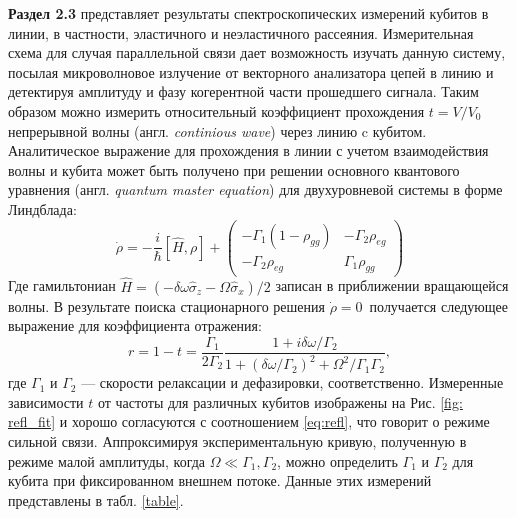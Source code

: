 \textbf{Раздел 2.3} представляет результаты спектроскопических измерений кубитов в линии, в частности, эластичного и неэластичного рассеяния. Измерительная схема для случая параллельной связи дает возможность изучать данную систему, посылая микроволновое излучение от векторного анализатора цепей в линию и детектируя амплитуду и фазу когерентной части прошедшего сигнала. Таким образом можно измерить относительный коэффициент прохождения $t=V/V_0$ непрерывной волны (англ. \textit{continious wave}) через линию c кубитом. Аналитическое выражение для прохождения в линии с учетом взаимодействия волны и кубита может быть получено при решении основного квантового уравнения (англ. \textit{quantum master equation}) для двухуровневой системы в форме Линдблада: 
\begin{equation}
\dot{\rho}=-\frac{i}{\hbar}[\hat{H},\rho] + 
\begin{pmatrix}
-\Gamma_1 (1-\rho_{gg})& -\Gamma_2 \rho_{eg}\\
-\Gamma_2 \rho_{eg}&\Gamma_1 \rho_{gg}
\end{pmatrix}
\label{eq:master}
\end{equation}
Где гамильтониан $\hat{H} = (-\delta\omega\hat{\sigma}_z -\Omega\hat{\sigma}_x)/2$ записан в приближении вращающейся волны. В результате поиска стационарного решения $\dot{\rho}=0$~получается следующее выражение для коэффициента отражения:
\begin{equation}
r = 1-t = \frac{\Gamma_1}{2\Gamma_2}\frac{1+i\delta\omega/\Gamma_2}{1+(\delta\omega/\Gamma_2)^2 + \Omega^2/\Gamma_1\Gamma_2},
\label{eq:refl}
\end{equation}
где $\Gamma_1$ и $\Gamma_2$ --- скорости релаксации и дефазировки, соответственно. Измеренные зависимости $t$ от частоты для различных кубитов изображены на Рис. \ref{fig: refl_fit} и хорошо согласуются с соотношением \eqref{eq:refl}, что говорит о режиме сильной связи. Аппроксимируя экспериментальную кривую, полученную в режиме малой амплитуды, когда $\Omega \ll \Gamma_1, \Gamma_2$, можно определить $\Gamma_1$ и $\Gamma_2$ для  кубита при фиксированном внешнем потоке. Данные этих измерений представлены в табл. \ref{table}.
